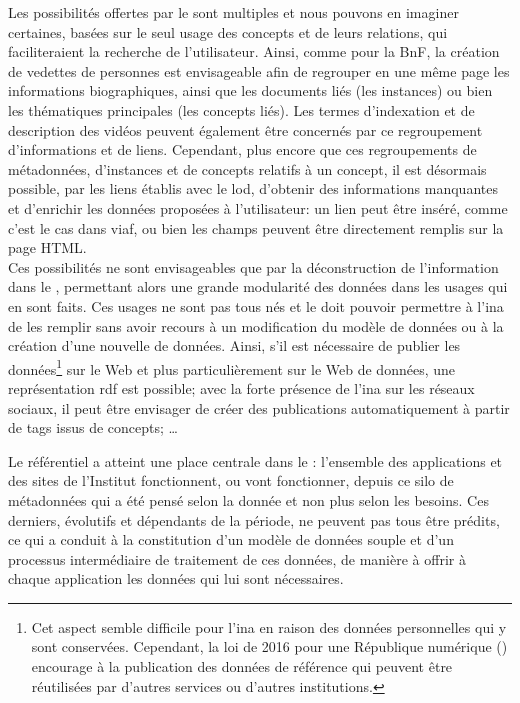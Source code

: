 Les possibilités offertes par le \ldd sont multiples et nous pouvons en imaginer certaines, basées sur le seul usage des concepts et de leurs relations, qui faciliteraient la recherche de l'utilisateur. Ainsi, comme pour la BnF, la création de vedettes de personnes est envisageable afin de regrouper en une même page les informations biographiques, ainsi que les documents liés (les instances) ou bien les thématiques principales (les concepts liés). Les termes d'indexation et de description des vidéos peuvent également être concernés par ce regroupement d'informations et de liens. Cependant, plus encore que ces regroupements de métadonnées, d'instances et de concepts relatifs à un concept, il est désormais possible, par les liens établis avec le \ac{lod}, d'obtenir des informations manquantes et d'enrichir les données proposées à l'utilisateur: un lien peut être inséré, comme c'est le cas dans \ac{viaf}, ou bien les champs peuvent être directement remplis sur la page HTML.\\

Ces possibilités ne sont envisageables que par la déconstruction de l'information dans le \ldd, permettant alors une grande modularité des données dans les usages qui en sont faits. Ces usages ne sont pas tous nés et le \ldd doit pouvoir permettre à l'\ac{ina} de les remplir sans avoir recours à un modification du modèle de données ou à la création d'une nouvelle de données. Ainsi, s'il est nécessaire de publier les données\footnote{Cet aspect semble difficile pour l'\ac{ina} en raison des données personnelles qui y sont conservées. Cependant, la loi de 2016 pour une République numérique (\cite{noauthor_loi_2016}) encourage à la publication des données de référence qui peuvent être réutilisées par d'autres services ou d'autres institutions.} sur le Web et plus particulièrement sur le Web de données, une représentation \ac{rdf} est possible; avec la forte présence de l'\ac{ina} sur les réseaux sociaux, il peut être envisager de créer des publications automatiquement à partir de tags issus de concepts; \dots

\bigskip
\bigskip
Le référentiel a atteint une place centrale dans le \ldd: l'ensemble des applications et des sites de l'Institut fonctionnent, ou vont fonctionner, depuis ce silo de métadonnées qui a été pensé selon la donnée et non plus selon les besoins. Ces derniers, évolutifs et dépendants de la période, ne peuvent pas tous être prédits, ce qui a conduit à la constitution d'un modèle de données souple et d'un processus intermédiaire de traitement de ces données, de manière à offrir à chaque application les données qui lui sont nécessaires.